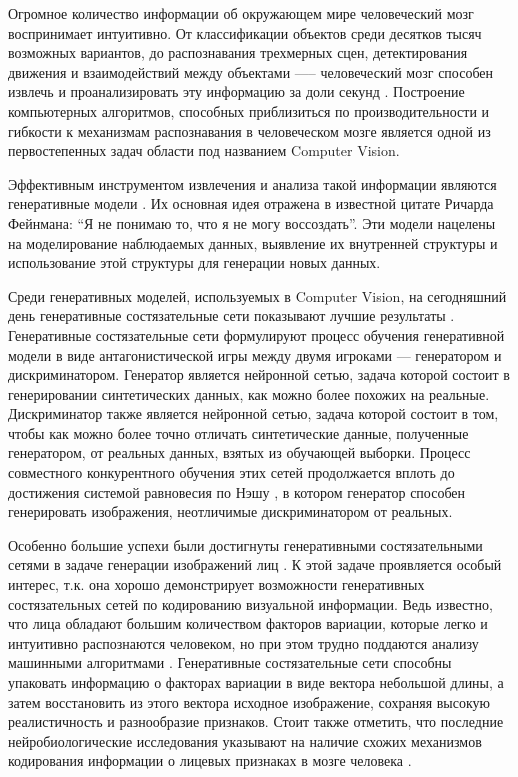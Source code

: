 
Огромное количество информации об окружающем мире человеческий мозг воспринимает интуитивно. 
От классификации объектов среди десятков тысяч возможных вариантов, до распознавания трехмерных сцен, детектирования движения и взаимодействий между объектами —-- человеческий мозг способен извлечь и проанализировать эту информацию за доли секунд \cite{dicarlo2012brain}. 
Построение компьютерных алгоритмов, способных приблизиться по производительности и гибкости к механизмам распознавания в человеческом мозге является одной из первостепенных задач области под названием Computer Vision.

Эффективным инструментом извлечения и анализа такой информации являются генеративные модели \cite{jebara2012machine}. 
Их основная идея отражена в известной цитате Ричарда Фейнмана: “Я не понимаю то, что я не могу воссоздать”. 
Эти модели нацелены на моделирование наблюдаемых данных, выявление их внутренней структуры и использование этой структуры для генерации новых данных.

Среди генеративных моделей, используемых в Computer Vision, на сегодняшний день генеративные состязательные сети показывают  лучшие результаты \cite{generative2020survey}. 
Генеративные состязательные \cite{goodfellow2014generative} сети формулируют процесс обучения генеративной модели в виде антагонистической игры между двумя игроками --- генератором и дискриминатором. 
Генератор является нейронной сетью, задача которой состоит в генерировании синтетических данных, как можно более похожих на реальные. 
Дискриминатор также является нейронной сетью, задача которой состоит в том, чтобы как можно более точно отличать синтетические данные, полученные генератором, от реальных данных, взятых из обучающей выборки. 
Процесс совместного конкурентного обучения этих сетей продолжается вплоть до достижения системой равновесия по Нэшу \cite{goodfellow2017nips}, в котором генератор способен генерировать изображения, неотличимые дискриминатором от реальных.

Особенно большие успехи были достигнуты генеративными состязательными сетями в задаче генерации изображений лиц \cite{progressive-growing-gan, StyleGAN, karras2020stylegan2}. 
К этой задаче проявляется особый интерес, т.к. она хорошо демонстрирует возможности генеративных состязательных сетей по кодированию визуальной информации. 
Ведь известно, что лица обладают большим количеством факторов вариации, которые легко и интуитивно распознаются человеком, но при этом трудно поддаются анализу машинными алгоритмами \cite{face2008perception}.
Генеративные состязательные сети способны упаковать информацию о факторах вариации в виде вектора небольшой длины, а затем восстановить из этого вектора исходное изображение, сохраняя  высокую реалистичность и разнообразие признаков. 
Стоит также отметить, что последние нейробиологические исследования указывают на наличие схожих механизмов кодирования информации о лицевых признаках в мозге человека \cite{facial2017code}.

